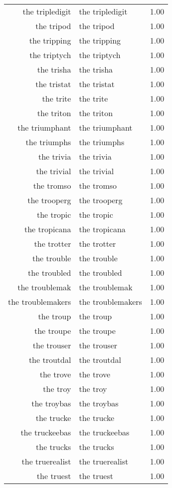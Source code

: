 \begin{table}[ht]
\begin{tabular}{rlr}
  the tripledigit & the tripledigit & 1.00 \\ 
  the tripod & the tripod & 1.00 \\ 
  the tripping & the tripping & 1.00 \\ 
  the triptych & the triptych & 1.00 \\ 
  the trisha & the trisha & 1.00 \\ 
  the tristat & the tristat & 1.00 \\ 
  the trite & the trite & 1.00 \\ 
  the triton & the triton & 1.00 \\ 
  the triumphant & the triumphant & 1.00 \\ 
  the triumphs & the triumphs & 1.00 \\ 
  the trivia & the trivia & 1.00 \\ 
  the trivial & the trivial & 1.00 \\ 
  the tromso & the tromso & 1.00 \\ 
  the trooperg & the trooperg & 1.00 \\ 
  the tropic & the tropic & 1.00 \\ 
  the tropicana & the tropicana & 1.00 \\ 
  the trotter & the trotter & 1.00 \\ 
  the trouble & the trouble & 1.00 \\ 
  the troubled & the troubled & 1.00 \\ 
  the troublemak & the troublemak & 1.00 \\ 
  the troublemakers & the troublemakers & 1.00 \\ 
  the troup & the troup & 1.00 \\ 
  the troupe & the troupe & 1.00 \\ 
  the trouser & the trouser & 1.00 \\ 
  the troutdal & the troutdal & 1.00 \\ 
  the trove & the trove & 1.00 \\ 
  the troy & the troy & 1.00 \\ 
  the troybas & the troybas & 1.00 \\ 
  the trucke & the trucke & 1.00 \\ 
  the truckeebas & the truckeebas & 1.00 \\ 
  the trucks & the trucks & 1.00 \\ 
  the truerealist & the truerealist & 1.00 \\ 
  the truest & the truest & 1.00 \\ 

\end{tabular}
\end{table}
